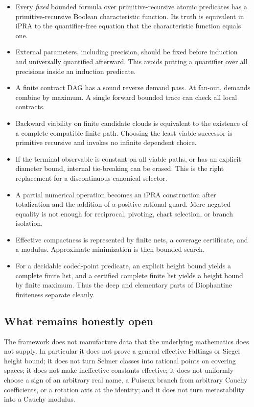 \begin{itemize}
\item Every \emph{fixed} bounded formula over primitive-recursive atomic predicates has a primitive-recursive Boolean characteristic function. Its truth is equivalent in iPRA to the quantifier-free equation that the characteristic function equals one.
\item External parameters, including precision, should be fixed before induction and universally quantified afterward. This avoids putting a quantifier over all precisions inside an induction predicate.
\item A finite contract DAG has a sound reverse demand pass. At fan-out, demands combine by maximum. A single forward bounded trace can check all local contracts.
\item Backward viability on finite candidate clouds is equivalent to the existence of a complete compatible finite path. Choosing the least viable successor is primitive recursive and invokes no infinite dependent choice.
\item If the terminal observable is constant on all viable paths, or has an explicit diameter bound, internal tie-breaking can be erased. This is the right replacement for a discontinuous canonical selector.
\item A partial numerical operation becomes an iPRA construction after totalization and the addition of a positive rational guard. Mere negated equality is not enough for reciprocal, pivoting, chart selection, or branch isolation.
\item Effective compactness is represented by finite nets, a coverage certificate, and a modulus. Approximate minimization is then bounded search.
\item For a decidable coded-point predicate, an explicit height bound yields a complete finite list, and a certified complete finite list yields a height bound by finite maximum. Thus the deep and elementary parts of Diophantine finiteness separate cleanly.
\end{itemize}

\subsection{What remains honestly open}

The framework does not manufacture data that the underlying mathematics does not supply. In particular it does not prove a general effective Faltings or Siegel height bound; it does not turn Selmer classes into rational points on covering spaces; it does not make ineffective constants effective; it does not uniformly choose a sign of an arbitrary real name, a Puiseux branch from arbitrary Cauchy coefficients, or a rotation axis at the identity; and it does not turn metastability into a Cauchy modulus.

